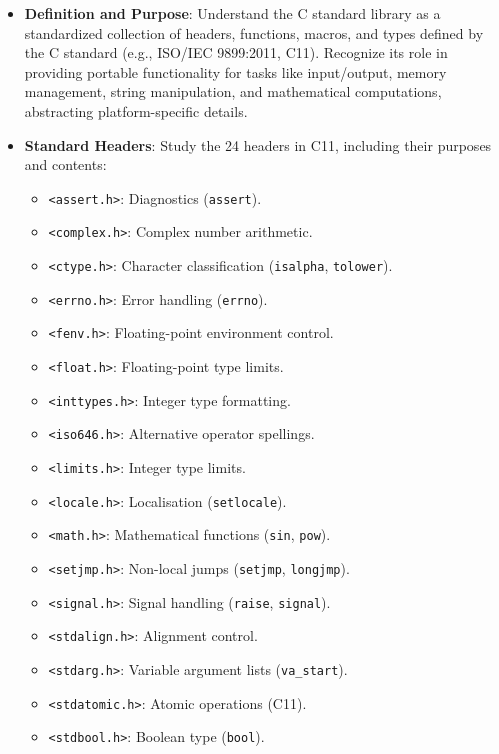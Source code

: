 \documentclass[a4paper,12pt]{article}
\begin{document}
\begin{itemize}[noitemsep]
    \item \textbf{Definition and Purpose}: Understand the C standard library as a standardized collection of headers, functions, macros, and types defined by the C standard (e.g., ISO/IEC 9899:2011, C11). Recognize its role in providing portable functionality for tasks like input/output, memory management, string manipulation, and mathematical computations, abstracting platform-specific details.

    \item \textbf{Standard Headers}: Study the 24 headers in C11, including their purposes and contents:
    \begin{itemize}
        \item \texttt{<assert.h>}: Diagnostics (\texttt{assert}).
        \item \texttt{<complex.h>}: Complex number arithmetic.
        \item \texttt{<ctype.h>}: Character classification (\texttt{isalpha}, \texttt{tolower}).
        \item \texttt{<errno.h>}: Error handling (\texttt{errno}).
        \item \texttt{<fenv.h>}: Floating-point environment control.
        \item \texttt{<float.h>}: Floating-point type limits.
        \item \texttt{<inttypes.h>}: Integer type formatting.
        \item \texttt{<iso646.h>}: Alternative operator spellings.
        \item \texttt{<limits.h>}: Integer type limits.
        \item \texttt{<locale.h>}: Localisation (\texttt{setlocale}).
        \item \texttt{<math.h>}: Mathematical functions (\texttt{sin}, \texttt{pow}).
        \item \texttt{<setjmp.h>}: Non-local jumps (\texttt{setjmp}, \texttt{longjmp}).
        \item \texttt{<signal.h>}: Signal handling (\texttt{raise}, \texttt{signal}).
        \item \texttt{<stdalign.h>}: Alignment control.
        \item \texttt{<stdarg.h>}: Variable argument lists (\texttt{va\_start}).
        \item \texttt{<stdatomic.h>}: Atomic operations (C11).
        \item \texttt{<stdbool.h>}: Boolean type (\texttt{bool}).

\end{itemize}
\end{itemize}
\end{document}
